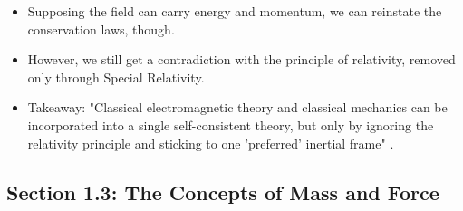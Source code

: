 \documentclass[../notes.tex]{subfiles}
\begin{document}
\begin{itemize}
\begin{enumerate}
\begin{itemize}
            \item Supposing the field can carry energy and momentum, we can reinstate the conservation laws, though.
            \item However, we still get a contradiction with the principle of relativity, removed only through Special Relativity.
            \item Takeaway: "Classical electromagnetic theory and classical mechanics can be incorporated into a single self-consistent theory, but only by ignoring the relativity principle and sticking to one 'preferred' inertial frame" \parencite[10]{bib:KibbleBerkshire}.
        \end{itemize}
    \end{enumerate}
\end{itemize}


\subsection*{Section 1.3: The Concepts of Mass and Force}
\end{document}
